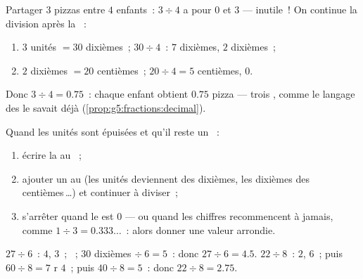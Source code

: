 \begin{example}\label{ex:g5:division:decimal}
Partager $3$ pizzas entre $4$ enfants~: $3 \div 4$ a pour 
$0$ et  $3$ --- inutile~! On continue la division après la
~:
\begin{enumerate}
  \item $3$ unités $= 30$ dixièmes~; $30 \div 4$~: $7$ dixièmes,
         $2$ dixièmes~;
  \item $2$ dixièmes $= 20$ centièmes~; $20 \div 4 = 5$ centièmes,
         $0$.
\end{enumerate}
Donc $3 \div 4 = 0.75$~: chaque enfant obtient $0.75$ pizza ---
trois , comme le langage des  le savait déjà
(\cref{prop:g5:fractions:decimal}).
\end{example}

\begin{method}\label{met:g5:division:continue}
Quand les unités sont épuisées et qu'il reste un ~:
\begin{enumerate}
  \item écrire la  au ~;
  \item ajouter un  au  (les unités deviennent des
        dixièmes, les dixièmes des centièmes\,\dots) et continuer à
        diviser~;
  \item s'arrêter quand le  est $0$ --- ou quand les chiffres
        recommencent à jamais, comme $1 \div 3 = 0.333\dots$~: alors
        donner une valeur arrondie.
\end{enumerate}
\end{method}

\begin{example}\label{ex:g5:division:continue}
$27 \div 6$~:  $4$,  $3$~; ~; $30$ dixièmes
$\div\ 6 = 5$~: donc $27 \div 6 = 4.5$. \quad
$22 \div 8$~: $2$,  $6$~; puis $60 \div 8 = 7$ r $4$~;
puis $40 \div 8 = 5$~: donc $22 \div 8 = 2.75$.
\end{example}

